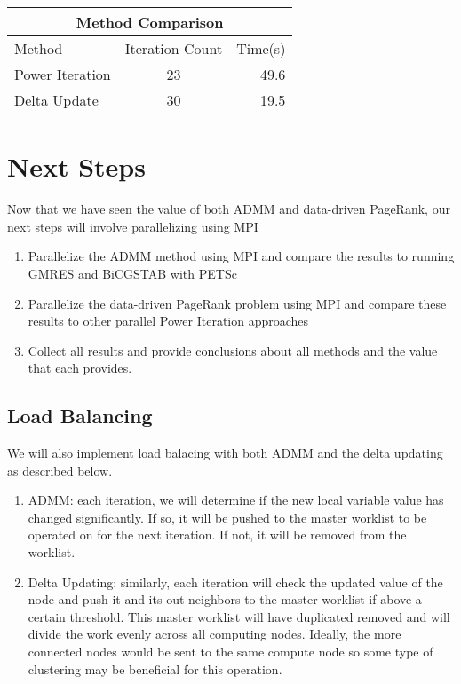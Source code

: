 \documentclass[a4paper,10pt]{article}
\begin{document}
\begin{center}
\begin{tabular}{l || c | r}
	\hline
	\multicolumn{3}{c}{Method Comparison} \\
	\hline\hline
	Method & Iteration Count & Time(s) \\
	\hline\hline
	Power Iteration & 23 & 49.6 \\
	Delta Update & 30 & 19.5 \\
\end{tabular}
\end{center}
\section{Next Steps}

Now that we have seen the value of both ADMM and data-driven PageRank, our next steps will involve parallelizing using MPI

\begin{enumerate}
	\item Parallelize the ADMM method using MPI and compare the results to running GMRES and BiCGSTAB with PETSc
	\item Parallelize the data-driven PageRank problem using MPI and compare these results to other parallel Power Iteration approaches
	\item Collect all results and provide conclusions about all methods and the value that each provides.
\end{enumerate}

\subsection{Load Balancing}
We will also implement load balacing with both ADMM and the delta updating as described below.

\begin{enumerate}
	\item ADMM: each iteration, we will determine if the new local variable value has changed significantly. If so, it will be pushed to the master worklist to be operated on for the next iteration. If not, it will be removed from the worklist.
	\item Delta Updating: similarly, each iteration will check the updated value of the node and push it and its out-neighbors to the master worklist if above a certain threshold. This master worklist will have duplicated removed and will divide the work evenly across all computing nodes. Ideally, the more connected nodes would be sent to the same compute node so some type of clustering may be beneficial for this operation.
\end{enumerate}
\end{document}
